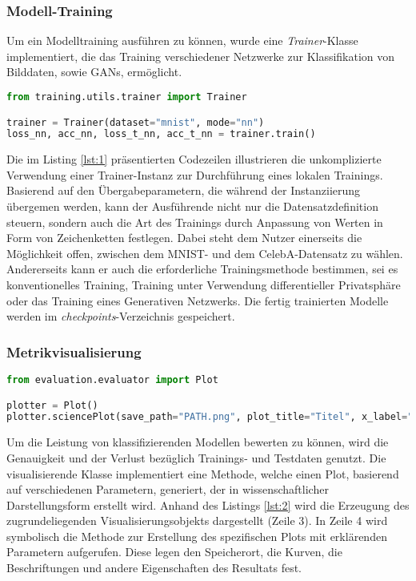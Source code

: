 \subsubsection{Modell-Training}
Um ein Modelltraining ausführen zu können, wurde eine \textit{Trainer}-Klasse implementiert, die das Training verschiedener Netzwerke zur Klassifikation von Bilddaten, sowie GANs, ermöglicht.
\begin{lstlisting}[language=Python, caption=Training eines neuronalen Netzwerks, label=lst:1]
from training.utils.trainer import Trainer 

trainer = Trainer(dataset="mnist", mode="nn")
loss_nn, acc_nn, loss_t_nn, acc_t_nn = trainer.train()
\end{lstlisting}
Die im Listing \ref{lst:1} präsentierten Codezeilen illustrieren die unkomplizierte Verwendung einer Trainer-Instanz zur Durchführung eines lokalen Trainings. Basierend auf den Übergabeparametern, die während der Instanziierung übergemen werden, kann der Ausführende nicht nur die Datensatzdefinition steuern, sondern auch die Art des Trainings durch Anpassung von Werten in Form von Zeichenketten festlegen. Dabei steht dem Nutzer einerseits die Möglichkeit offen, zwischen dem MNIST- und dem CelebA-Datensatz zu wählen. Andererseits kann er auch die erforderliche Trainingsmethode bestimmen, sei es konventionelles Training, Training unter Verwendung differentieller Privatsphäre oder das Training eines Generativen Netzwerks. Die fertig trainierten Modelle werden im \textit{checkpoints}-Verzeichnis gespeichert. 

\subsubsection{Metrikvisualisierung}

\begin{lstlisting}[language=Python, caption=Plot erstellen, label=lst:2]
from evaluation.evaluator import Plot

plotter = Plot()
plotter.sciencePlot(save_path="PATH.png", plot_title="Titel", x_label="X-Achsen-Beschriftung", y_label="Y-Achsen-Beschriftung", graphs=list(), x_limit=[von,bis], y_limit=[von,bis])
\end{lstlisting}
Um die Leistung von klassifizierenden Modellen bewerten zu können, wird die Genauigkeit und der Verlust bezüglich Trainings- und Testdaten genutzt. Die visualisierende Klasse implementiert eine Methode, welche einen Plot, basierend auf verschiedenen Parametern, generiert, der in wissenschaftlicher Darstellungsform erstellt wird. Anhand des Listings \ref{lst:2} wird die Erzeugung des zugrundeliegenden Visualisierungsobjekts dargestellt (Zeile 3). In Zeile 4 wird symbolisch die Methode zur Erstellung des spezifischen Plots mit \glqq erklärenden\grqq{} Parametern aufgerufen. Diese legen den Speicherort, die Kurven, die Beschriftungen und andere Eigenschaften des Resultats fest. 

